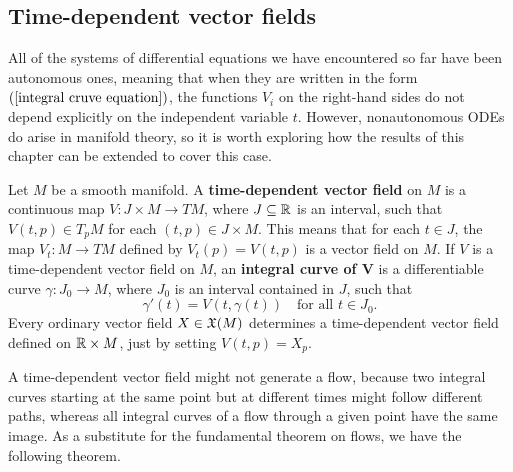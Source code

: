 \subsection{Time-dependent vector fields}
All of the systems of differential equations we have encountered so far have been autonomous ones, meaning that when they are written in the form $(\ref{integral cruve equation})$, the functions $V_i$ on the right-hand sides do not depend explicitly on the independent variable $t$. However, nonautonomous ODEs do arise in manifold theory, so it is worth exploring how the results of this chapter can be extended to cover this case.\par
Let $M$ be a smooth manifold. A \textbf{time-dependent vector field} on $M$ is a continuous map $V:J\times M\to TM$, where $J\subseteq\mathbb{R}$ is an interval, such that $V(t,p)\in T_pM$ for each $(t,p)\in J\times M$. This means that for each $t\in J$, the map $V_t:M\to TM$ defined by $V_t(p)=V(t,p)$ is a vector field on $M$. If $V$ is a time-dependent vector field on $M$, an \textbf{integral curve of $\bm{V}$} is a differentiable curve $\gamma:J_0\to M$, where $J_0$ is an interval contained in $J$, such that
\[\gamma'(t)=V(t,\gamma(t))\quad\text{for all $t\in J_0$}.\]
Every ordinary vector field $X\in\mathfrak{X}(M)$ determines a time-dependent vector field defined on $\mathbb{R}\times M$, just by setting $V(t,p)=X_p$.\par
A time-dependent vector field might not generate a flow, because two integral curves starting at the same point but at different times might follow different paths, whereas all integral curves of a flow through a given point have the same image. As a substitute for the fundamental theorem on flows, we have the following theorem.
